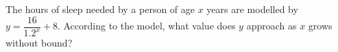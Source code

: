 The hours of sleep needed by a person of age $x$ years are modelled by $y=\dfrac{16}{1.2^x}+8$. According to the model, what value does $y$ approach as $x$ grows without bound?
